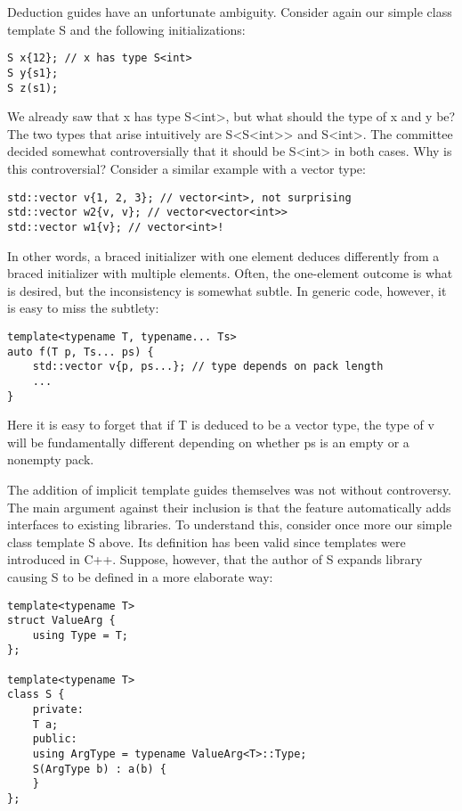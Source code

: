 Deduction guides have an unfortunate ambiguity. Consider again our simple class template S and the following initializations:

\begin{lstlisting}[style=styleCXX]
S x{12}; // x has type S<int>
S y{s1};
S z(s1);
\end{lstlisting}

We already saw that x has type S<int>, but what should the type of x and y be? The two types that arise intuitively are S<S<int>> and S<int>. The committee decided somewhat controversially that it should be S<int> in both cases. Why is this controversial? Consider a similar example with a vector type:

\begin{lstlisting}[style=styleCXX]
std::vector v{1, 2, 3}; // vector<int>, not surprising
std::vector w2{v, v}; // vector<vector<int>>
std::vector w1{v}; // vector<int>!
\end{lstlisting}

In other words, a braced initializer with one element deduces differently from a braced initializer with multiple elements. Often, the one-element outcome is what is desired, but the inconsistency is somewhat subtle. In generic code, however, it is easy to miss the subtlety:

\begin{lstlisting}[style=styleCXX]
template<typename T, typename... Ts>
auto f(T p, Ts... ps) {
	std::vector v{p, ps...}; // type depends on pack length
	...
}
\end{lstlisting}

Here it is easy to forget that if T is deduced to be a vector type, the type of v will be fundamentally different depending on whether ps is an empty or a nonempty pack.

The addition of implicit template guides themselves was not without controversy. The main argument against their inclusion is that the feature automatically adds interfaces to existing libraries. To understand this, consider once more our simple class template S above. Its definition has been valid since templates were introduced in C++. Suppose, however, that the author of S expands library causing S to be defined in a more elaborate way:

\begin{lstlisting}[style=styleCXX]
template<typename T>
struct ValueArg {
	using Type = T;
};

template<typename T>
class S {
	private:
	T a;
	public:
	using ArgType = typename ValueArg<T>::Type;
	S(ArgType b) : a(b) {
	}
};
\end{lstlisting}

